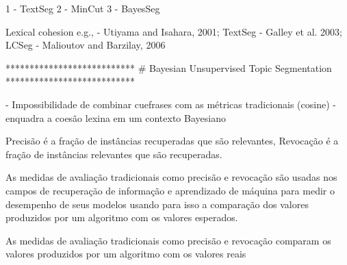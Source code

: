 


1 - TextSeg
2 - MinCut
3 - BayesSeg





Lexical cohesion e.g., 
	- Utiyama and Isahara,     2001; {TextSeg}
	- Galley et al.            2003; {LCSeg}
	- Malioutov and Barzilay,  2006  {}





***************************
# Bayesian Unsupervised Topic Segmentation
***************************

- Impossibilidade de combinar cuefrases com as métricas tradicionais (cosine)
- {enquadra a coesão lexina em um contexto Bayesiano}

























Precisão é a fração de instâncias recuperadas que são relevantes, 
Revocação é a fração de instâncias relevantes que são recuperadas.





As medidas de avaliação tradicionais como precisão e revocação são usadas nos campos de recuperação de informação e aprendizado de máquina para medir o desempenho de seus modelos usando para isso a comparação dos valores produzidos por um algoritmo com os valores esperados.



As medidas de avaliação tradicionais como precisão e revocação comparam os valores produzidos por um algoritmo com os valores reais 



